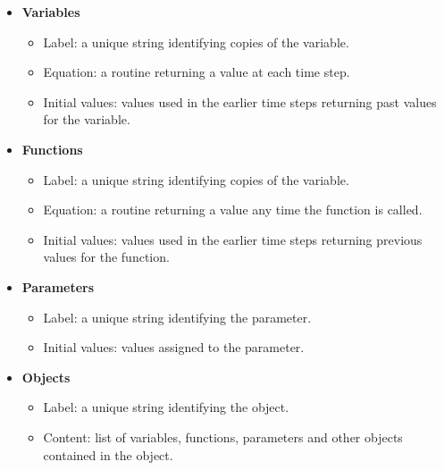 \documentclass [11pt,a4paper] {book}
\begin{document}
 \begin{itemize}
  \item \textbf{Variables} \vspace{-0.3cm}
    \begin{itemize}
     \item Label: a unique string identifying copies of the variable. \vspace{-0.2cm}
     \item Equation: a routine returning a value at each time step.\vspace{-0.2cm}
     \item Initial values: values used in the earlier time steps returning past values for the variable.\vspace{-0.2cm}
    \end{itemize}
  \item \textbf{Functions}\vspace{-0.3cm}
    \begin{itemize}
     \item Label: a unique string identifying copies of the variable. \vspace{-0.2cm}
     \item Equation: a routine returning a value any time the function is called. \vspace{-0.2cm}
     \item Initial values: values used in the earlier time steps returning previous values for the function.\vspace{-0.2cm}
    \end{itemize}
  \item \textbf{Parameters }\vspace{-0.3cm}
      \begin{itemize}
       \item Label: a unique string identifying the parameter. \vspace{-0.2cm}
       \item Initial values: values assigned to the parameter.\vspace{-0.2cm}
      \end{itemize}
 \item \textbf{Objects} \vspace{-0.3cm}
    \begin{itemize}
     \item Label: a unique string identifying the object. \vspace{-0.2cm}
     \item Content: list of variables, functions, parameters and other objects contained in the object.\vspace{-0.2cm}
    \end{itemize}
 

\end{itemize}
\end{document}
